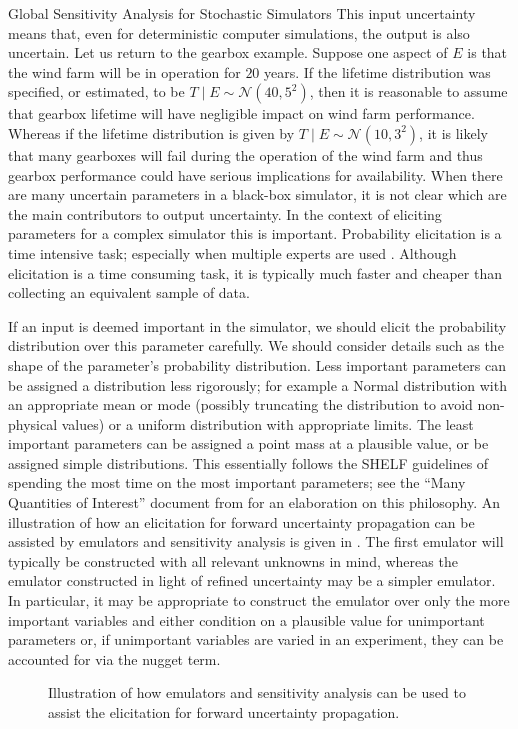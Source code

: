 \begin{chapter}{Global Sensitivity Analysis for Stochastic Simulators\label{Ch:sensitivity}}
This input uncertainty means that, even for deterministic computer simulations, the output is also uncertain. Let us return to the gearbox example. Suppose one aspect of $E$ is that the wind farm will be in operation for $20$ years. If the lifetime distribution was specified, or estimated, to be $T \mid E \sim \mathcal{N}(40, 5^2)$, then it is reasonable to assume that gearbox lifetime will have negligible impact on wind farm performance. Whereas if the lifetime distribution is given by $T \mid E \sim \mathcal{N}(10, 3^2)$, it is likely that many gearboxes will fail during the operation of the wind farm and thus gearbox performance could have serious implications for availability. When there are many uncertain parameters in a black-box simulator, it is not clear which are the main contributors to output uncertainty. In the context of eliciting parameters for a complex simulator this is important. Probability elicitation is a time intensive task; especially when multiple experts are used \citep{Williams2021}. Although elicitation is a time consuming task, it is typically much faster and cheaper than collecting an equivalent sample of data.

If an input is deemed important in the simulator, we should elicit the probability distribution over this parameter carefully. We should consider details such as the shape of the parameter's probability distribution. Less important parameters can be assigned a distribution less rigorously; for example a Normal distribution with an appropriate mean or mode (possibly truncating the distribution to avoid non-physical values) or a uniform distribution with appropriate limits. The least important parameters can be assigned a point mass at a plausible value, or be assigned simple distributions. This essentially follows the SHELF guidelines of spending the most time on the most important parameters; see the ``Many Quantities of Interest'' document from \citet{SHELF4} for an elaboration on this philosophy. An illustration of how an elicitation for forward uncertainty propagation can be assisted by emulators and sensitivity analysis is given in . The first emulator will typically be constructed with all relevant unknowns in mind, whereas the emulator constructed in light of refined uncertainty may be a simpler emulator. In particular, it may be appropriate to construct the emulator over only the more important variables and either condition on a plausible value for unimportant parameters or, if unimportant variables are varied in an experiment, they can be accounted for via the nugget term.
\begin{figure}

\caption{Illustration of how emulators and sensitivity analysis can be used to assist the elicitation for forward uncertainty propagation.}
\label{Fig:elicitation-flowchart}
\end{figure}


\end{chapter}
